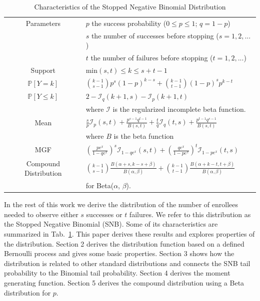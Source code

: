 \documentclass[review]{elsarticle}
\begin{document}
\begin{table}[t!]
\caption{Characteristics of the Stopped Negative Binomial Distribution}
\label{tab:snb}
\begin{center}
\begin{tabular}{|c|l|} \hline
Parameters & $p$ the success probability ($0\leq p \leq 1$; $q = 1-p$) \\
           & $s$ the number of successes before stopping ($s=1, 2, ...$)\\
           & $t$ the number of failures before stopping ($t=1, 2, ...$)\\ \hline
Support & min$(s,t) \leq k \leq s+t-1$  \\ \hline
$\mathbb{P}[Y=k]$ & ${k-1 \choose s-1} p^s (1-p)^{k-s} + {k-1 \choose t-1} (1-p)^s p^{k-t}$\\ \hline
$\mathbb{P}[Y \leq k]$ & $2 - \mathcal{I}_{q}(k+1, s) - \mathcal{I}_{p}(k+1, t)$\\ 
    & where $\mathcal{I}$ is the regularized incomplete beta function.\\ \hline
Mean & $\frac{s}{p} \mathcal{I}_p(s,t) + \frac{p^{s-1} q^{t-1}}{B(s,t)} +
  \frac{t}{q} \mathcal{I}_q(t,s) + \frac{p^{t-1} q^{s-1}}{B(s,t)}$\\ 
  & where $B$ is the beta function \\ \hline
MGF & $\left(\frac{p e^x}{1 - qe^x}\right)^s 
  \mathcal{I}_{1-qe^x} (s, t) + \left(\frac{qe^x}{1-pe^x}\right)^t 
  \mathcal{I}_{1-pe^x}(t, s) $\\ \hline
Compound Distribution & 
${k-1 \choose s-1} \frac{B\left(\alpha+s, k-s+\beta \right)}{B(\alpha, \beta)}+
{k-1 \choose t-1} \frac{B\left(\alpha + k-t, t+\beta\right)}{B(\alpha,\beta)}$\\
& for Beta($\alpha$, $\beta$). \\ \hline
\end{tabular}
\end{center}
\end{table}

In the rest of this work we derive the distribution of the number of 
enrollees needed
to observe either $s$ successes or $t$ failures. We refer to this distribution
as the Stopped Negative Binomial (SNB). Some of its characteristics are
summarized in Tab.~\ref{tab:snb}.
This paper derives these results
and explores properties of the distribution.
Section 2 derives the distribution function
based on a defined Bernoulli process and gives some basic properties.
Section 3 shows how the distribution is related to other standard
distributions and connects the SNB tail probability to the Binomial tail 
probability.
Section 4 derives the moment generating function.
Section 5 derives the compound distribution using a Beta distribution
for $p$. 
\end{document}
